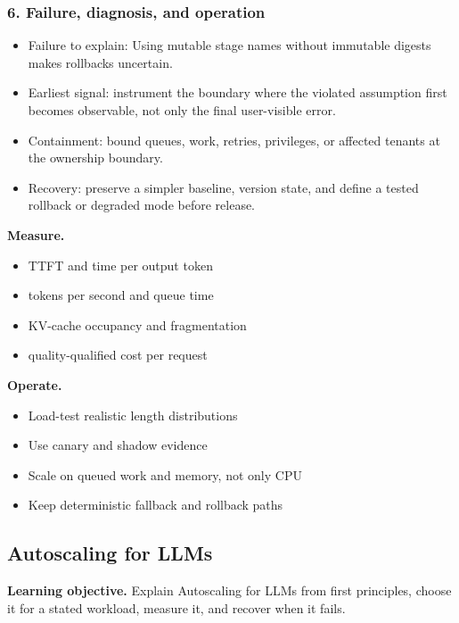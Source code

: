 \subsubsection*{6. Failure, diagnosis, and operation}
\begin{itemize}
\item Failure to explain: Using mutable stage names without immutable digests makes rollbacks uncertain.
\item Earliest signal: instrument the boundary where the violated assumption first becomes observable, not only the final user-visible error.
\item Containment: bound queues, work, retries, privileges, or affected tenants at the ownership boundary.
\item Recovery: preserve a simpler baseline, version state, and define a tested rollback or degraded mode before release.
\end{itemize}
\textbf{Measure.}\begin{itemize}
\item TTFT and time per output token
\item tokens per second and queue time
\item KV-cache occupancy and fragmentation
\item quality-qualified cost per request
\end{itemize}
\textbf{Operate.}\begin{itemize}
\item Load-test realistic length distributions
\item Use canary and shadow evidence
\item Scale on queued work and memory, not only CPU
\item Keep deterministic fallback and rollback paths
\end{itemize}
\subsection{Autoscaling for LLMs}
\textbf{Learning objective.} Explain Autoscaling for LLMs from first principles, choose it for a stated workload, measure it, and recover when it fails.
